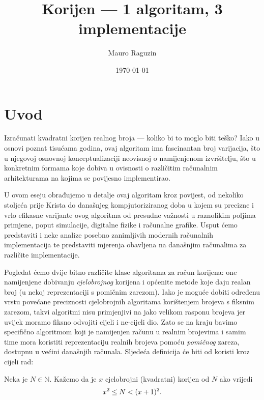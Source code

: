 \documentclass[12pt]{scrartcl}
\title{Korijen --- 1 algoritam, 3 implementacije}
\author{Mauro Raguzin}
\date{\today}
\begin{document}
\maketitle
\tableofcontents
\pagebreak

\section{Uvod}
Izračunati kvadratni korijen realnog broja --- koliko bi to moglo biti teško? Iako u osnovi poznat tisućama godina,
ovaj algoritam ima fascinantan broj varijacija, što u njegovoj osnovnoj konceptualizaciji neovisnoj o namijenjenom izvršitelju, što u konkretnim
formama koje dobiva u ovisnosti o različitim računalnim arhitekturama na kojima se povijesno implementirao.

U ovom eseju obrađujemo u detalje ovaj algoritam kroz povijest, od nekoliko stoljeća prije Krista
do današnjeg kompjutoriziranog doba u kojem su precizne i vrlo efikasne varijante
ovog algoritma od presudne važnosti u raznolikim poljima primjene, poput simulacije, digitalne fizike i računalne grafike. Usput ćemo predstaviti
i neke analize posebno zanimljivih modernih računalnih implementacija te predstaviti mjerenja obavljena na današnjim računalima za različite implementacije.

Pogledat ćemo dvije bitno različite klase algoritama za račun korijena: one namijenjene dobivanju \emph{cjelobrojnog} korijena i općenite
metode koje daju realan broj (u nekoj reprezentaciji s pomičnim zarezom). Iako je moguće dobiti određenu vrstu povećane preciznosti
cjelobrojnih algoritama korištenjem brojeva s fiksnim zarezom, takvi algoritmi nisu primjenjivi na jako velikom rasponu brojeva jer uvijek moramo
fiksno odvojiti cijeli i ne-cijeli dio. Zato se na kraju bavimo specifično algoritmom koji je namijenjen računu u realnim
brojevima i samim time mora koristiti reprezentaciju realnih brojeva pomoću \emph{pomičnog} zareza, dostupnu u većini današnjih računala.
Sljedeća definicija će biti od koristi kroz cijeli rad:
\begin{definicija}
    Neka je $N\in\mathbb{N}$. Kažemo da je $x$ cjelobrojni (kvadratni) korijen od $N$ ako vrijedi
    \begin{equation*}
        x^2 \leq N < (x+1)^2\text.
    \end{equation*}
\end{definicija}
\end{document}
